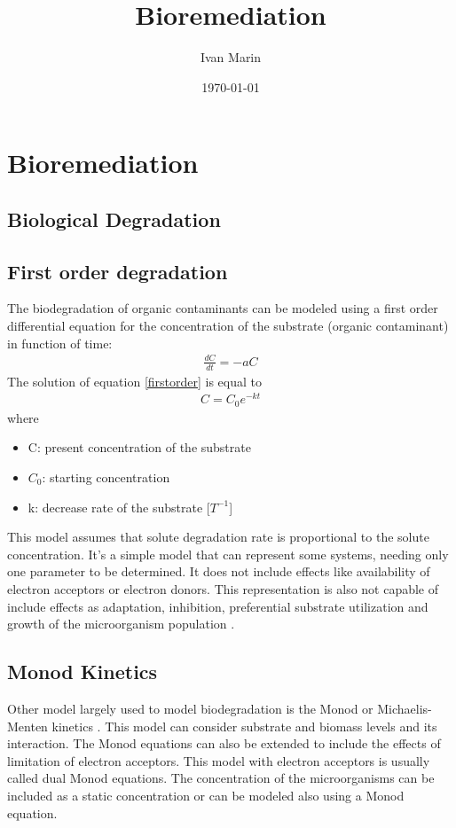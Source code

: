 \documentclass[12pt,twoside]{report}
\title{Bioremediation}
\author{Ivan Marin}
\date{\today}
\begin{document}
\maketitle
\tableofcontents




\chapter{Bioremediation}
\section{Biological Degradation}

\section{First order degradation}
The biodegradation of organic contaminants can be modeled using a first order differential equation for the concentration of the substrate (organic contaminant) in function of time:
\begin{align}\label{firstorder}
\frac{dC}{dt} = -aC
\end{align}
The solution of equation \eqref{firstorder} is equal to
\begin{align}
C = C_{0}e^{-kt}
\end{align}
where 
\begin{itemize}
\item C: present concentration of the substrate
\item $C_{0}$: starting concentration
\item k: decrease rate of the substrate [$T^{-1}$]
\end{itemize}
This model assumes that solute degradation rate is proportional to the solute concentration. It's a simple model that can represent some systems, needing only one parameter to be determined. It does not include effects like availability of electron acceptors or electron donors. This representation is also not capable of include effects as adaptation, inhibition, preferential substrate utilization and growth of the microorganism population \cite{schirmer_relative-least-squares_1999}.


\section{Monod Kinetics}
Other model largely used to model biodegradation is the Monod or Michaelis-Menten kinetics \cite{monod, appelo}. This model can consider substrate and biomass levels and its interaction. The Monod equations can also be extended to include the effects of limitation of electron acceptors. This model with electron acceptors is usually called dual Monod equations. The concentration of the microorganisms can be included as a static concentration or can be modeled also using a Monod equation.
\end{document}
